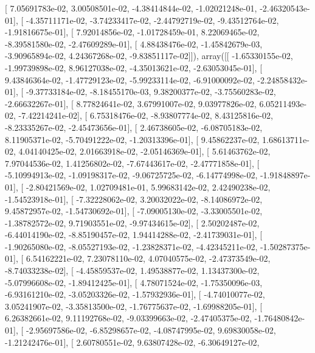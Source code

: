 \documentclass{article}
\begin{document}
       [  7.05691783e-02,   3.00508501e-02,  -4.38414844e-02,
         -1.02021248e-01,  -2.46320543e-01],
       [ -4.35711171e-02,  -3.74233417e-02,  -2.44792719e-02,
         -9.43512764e-02,  -1.91816675e-01],
       [  7.92014856e-02,  -1.01728459e-01,   8.22069465e-02,
         -8.39581580e-02,  -2.47609289e-01],
       [  4.88438476e-02,  -1.45842679e-03,  -3.90965894e-02,
          4.24367268e-02,  -9.83851117e-02]]), array([[ -1.65330155e-02,  -1.99739898e-02,   8.96127038e-02,
         -4.35013621e-02,  -2.63053045e-01],
       [  9.43846364e-02,  -1.47729123e-02,  -5.99233114e-02,
         -6.91000092e-02,  -2.24858432e-01],
       [ -9.37733184e-02,  -8.18455170e-03,   9.38200377e-02,
         -3.75560283e-02,  -2.66632267e-01],
       [  8.77824641e-02,   3.67991007e-02,   9.03977826e-02,
          6.05211493e-02,  -7.42214241e-02],
       [  6.75318476e-02,  -8.93807774e-02,   8.43125816e-02,
         -8.23335267e-02,  -2.45473656e-01],
       [  2.46738605e-02,  -6.08705183e-02,   8.11905371e-02,
         -5.70491222e-02,  -1.20313396e-01],
       [  9.45862237e-02,   1.68613711e-02,   4.04140425e-02,
          2.01663918e-02,  -2.05146369e-01],
       [  5.61463762e-02,   7.97044536e-02,   1.41256802e-02,
         -7.67443617e-02,  -2.47771858e-01],
       [ -5.10994913e-02,  -1.09198317e-02,  -9.06725725e-02,
         -6.14774998e-02,  -1.91848897e-01],
       [ -2.80421569e-02,   1.02709481e-01,   5.99683142e-02,
          2.42490238e-02,  -1.54523918e-01],
       [ -7.32228062e-02,   3.20032022e-02,  -8.14086972e-02,
          9.45872957e-02,  -1.54730692e-01],
       [ -7.09005130e-02,  -3.33005501e-02,  -1.38782572e-02,
          9.71903551e-02,  -9.97434615e-02],
       [  2.50202487e-02,  -6.44014190e-02,  -8.85190457e-02,
          1.94414288e-02,  -2.41739031e-01],
       [ -1.90265080e-02,  -8.05527193e-02,  -1.23828371e-02,
         -4.42345211e-02,  -1.50287375e-01],
       [  6.54162221e-02,   7.23078110e-02,   4.07040575e-02,
         -2.47373549e-02,  -8.74033238e-02],
       [ -4.45859537e-02,   1.49538877e-02,   1.13437300e-02,
         -5.07996608e-02,  -1.89412425e-01],
       [  4.78071524e-02,  -1.75350096e-03,  -6.93161210e-02,
         -3.05203326e-02,  -1.57932936e-01],
       [ -4.74010077e-02,   3.05241907e-02,  -3.35813500e-02,
         -1.76775637e-02,  -1.69988205e-01],
       [  6.26382661e-02,   9.11192768e-02,  -9.03399663e-02,
         -2.47405375e-02,  -1.76480842e-01],
       [ -2.95697586e-02,  -6.85298657e-02,  -4.08747995e-02,
          9.69830058e-02,  -1.21242476e-01],
       [  2.60780551e-02,   9.63807428e-02,  -6.30649127e-02,
\end{document}
